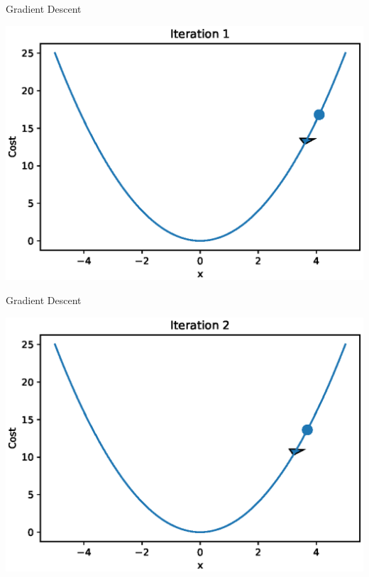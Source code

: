 \documentclass{beamer}
\begin{document}
\begin{frame}{Gradient Descent}
  \begin{center}
       \includegraphics[totalheight=6cm]{gradient-descent/iteration-1.eps}
   \end{center}
\end{frame}

\begin{frame}{Gradient Descent}
  \begin{center}
       \includegraphics[totalheight=6cm]{gradient-descent/iteration-2.eps}
   \end{center}
\end{frame}
\end{document}
